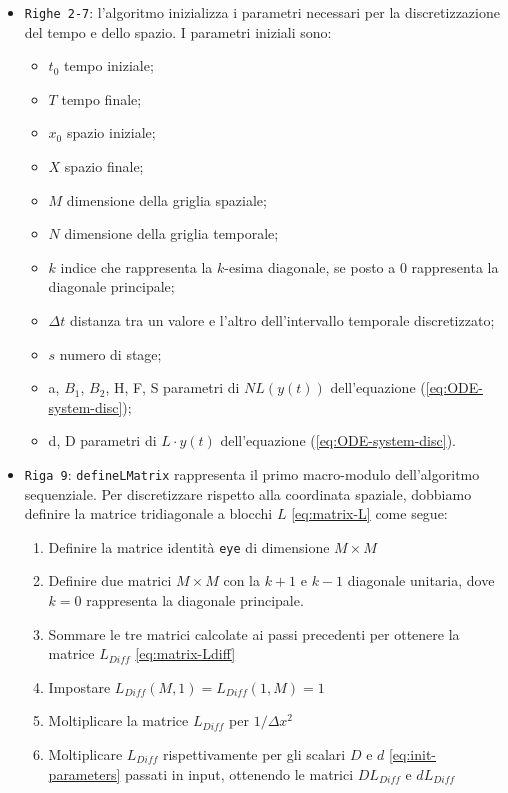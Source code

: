 \begin{itemize}
    \item \texttt{Righe 2-7}: l'algoritmo inizializza i parametri necessari per la discretizzazione del tempo e dello spazio. I parametri iniziali sono:
    \begin{itemize}
        \item $t_0$ tempo iniziale;
        \item $T$ tempo finale;
        \item $x_0$ spazio iniziale;
        \item $X$ spazio finale;
        \item $M$ dimensione della griglia spaziale;
        \item $N$ dimensione della griglia temporale;
        \item $k$ indice che rappresenta la $k$-esima diagonale, se posto a 0 rappresenta la diagonale principale;
        \item $\Delta t$ distanza tra un valore e l'altro dell'intervallo temporale discretizzato;
        \item $s$ numero di stage;
        \item a, $B_1$, $B_2$, H, F, S parametri di $NL(y(t))$ dell'equazione (\ref{eq:ODE-system-disc});
        \item d, D parametri di $L \cdot y(t)$ dell'equazione (\ref{eq:ODE-system-disc}).
    \end{itemize}
    \item \texttt{Riga 9}: \texttt{defineLMatrix} rappresenta il primo macro-modulo dell'algoritmo sequenziale. Per discretizzare rispetto alla coordinata spaziale, dobbiamo definire la matrice tridiagonale a blocchi $L$ \eqref{eq:matrix-L} come segue:
    \begin{enumerate}
        \item Definire la matrice identità \texttt{eye} di dimensione $M \times M$
        \item Definire due matrici $M \times M$ con la $k + 1$ e $k - 1$ diagonale unitaria, dove $k = 0$ rappresenta la diagonale principale.
        \item Sommare le tre matrici calcolate ai passi precedenti per ottenere la matrice $L_{Diff}$ \eqref{eq:matrix-Ldiff}
        \item Impostare $L_{Diff} (M,1) = L_{Diff} (1,M) = 1$
        \item Moltiplicare la matrice $L_{Diff}$ per $1 / \Delta x^2$
        \item Moltiplicare $L_{Diff}$ rispettivamente per gli scalari $D$ e $d$ \eqref{eq:init-parameters} passati in input, ottenendo le matrici $DL_{Diff}$ e $dL_{Diff}$

\end{enumerate}
\end{itemize}
